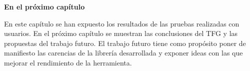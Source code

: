 \bigskip
\Large{\textbf{En el pr\'oximo cap\'itulo}}\\
\normalsize

En este cap\'itulo se han expuesto los resultados de las pruebas realizadas con usuarios. En el pr\'oximo cap\'itulo se muestran las conclusiones del TFG y las propuestas del trabajo futuro. El trabajo futuro tiene como prop\'osito poner de manifiesto las carencias de la librer\'ia desarrollada y exponer ideas con las que mejorar el rendimiento de la herramienta.\\